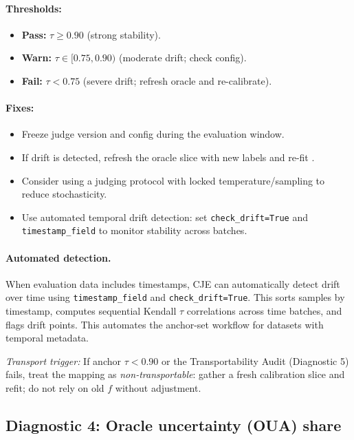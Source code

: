 \paragraph{Thresholds:}
\begin{itemize}
\item \textbf{Pass:} $\tau \ge 0.90$ (strong stability).
\item \textbf{Warn:} $\tau \in [0.75, 0.90)$ (moderate drift; check config).
\item \textbf{Fail:} $\tau < 0.75$ (severe drift; refresh oracle and re-calibrate).
\end{itemize}

\paragraph{Fixes:}
\begin{itemize}
\item Freeze judge version and config during the evaluation window.
\item If drift is detected, refresh the oracle slice with new labels and re-fit \autocal.
\item Consider using a judging protocol with locked temperature/sampling to reduce stochasticity.
\item Use automated temporal drift detection: set \texttt{check\_drift=True} and \texttt{timestamp\_field} to monitor stability across batches.
\end{itemize}

\paragraph{Automated detection.} When evaluation data includes timestamps, CJE can automatically detect drift over time using \texttt{timestamp\_field} and \texttt{check\_drift=True}. This sorts samples by timestamp, computes sequential Kendall $\tau$ correlations across time batches, and flags drift points. This automates the anchor-set workflow for datasets with temporal metadata.

\noindent\emph{Transport trigger:} If anchor $\tau < 0.90$ or the Transportability Audit (Diagnostic 5) fails, treat the mapping as \emph{non-transportable}: gather a fresh calibration slice and refit; do not rely on old $f$ without adjustment.

\subsection{Diagnostic 4: Oracle uncertainty (OUA) share}

